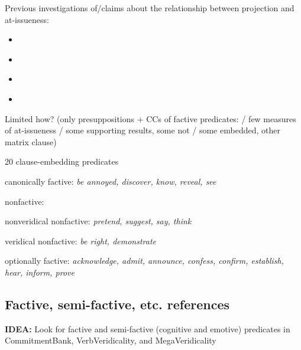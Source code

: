 \documentclass[11pt,fleqn]{article}
\newcommand{\6}{\mbox{$[\hspace*{-.6mm}[$}}
\newcommand{\9}{\mbox{$]\hspace*{-.6mm}]$}}
\begin{document}
Previous investigations of/claims about the relationship between projection and at-issueness:

\begin{itemize}

\item \citealt{brst-salt10,brst-ar}

\item \citealt{xue-onea11}

\item \citealt{tbd-variability}

\item \citealt{koev2018}

\end{itemize}

Limited how? (only presuppositions + CCs of factive predicates: \citealt{degen-tonhauser-factive} / few measures of at-issueness / some supporting results, some not / some embedded, other matrix clause)

\begin{exe}
\ex\label{pred} 20 clause-embedding predicates 

\begin{xlist}

\ex canonically factive: {\em be annoyed, discover, know, reveal, see}

\ex nonfactive:

\begin{xlist}

\ex nonveridical nonfactive: {\em pretend, suggest, say, think}

\ex veridical nonfactive: {\em be right, demonstrate}

\end{xlist}

\ex optionally factive: {\em acknowledge, admit, announce, confess, confirm, establish, hear, inform, prove}

\end{xlist}

\end{exe}

\subsection{Factive, semi-factive, etc. references}

{\bf IDEA:} Look for factive and semi-factive (cognitive and emotive) predicates in CommitmentBank, VerbVeridicality, and MegaVeridicality
\end{document}
